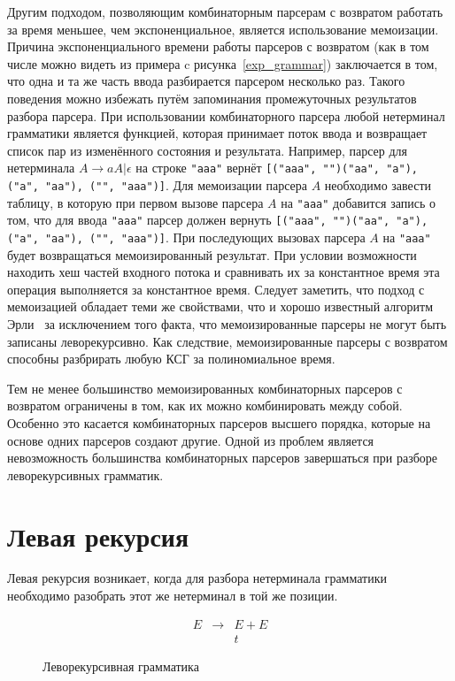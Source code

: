 \documentclass[times]{itmo-student-thesis}
\begin{document}
Другим подходом, позволяющим комбинаторным парсерам с возвратом работать за время меньшее, чем экспоненциальное,
является использование мемоизации. Причина экспоненциального времени работы парсеров с возвратом (как в том числе
можно видеть из примера c рисунка~\ref{exp_grammar}) заключается в том, что одна и та же часть ввода разбирается
парсером несколько раз. Такого поведения можно избежать путём запоминания промежуточных результатов разбора парсера.
При использовании комбинаторного парсера любой нетерминал грамматики является функцией, которая принимает поток ввода и
возвращает список пар из изменённого состояния и результата. Например, парсер для нетерминала $A \to aA | \epsilon$ на
строке \lstinline{"aaa"} вернёт \lstinline{[("aaa", "")("aa", "a"), ("a", "aa"), ("", "aaa")]}. Для мемоизации парсера
$A$ необходимо завести таблицу, в которую при первом вызове парсера $A$ на
\lstinline{"aaa"} добавится запись о том, что для ввода \lstinline{"aaa"} парсер должен вернуть
\lstinline{[("aaa", "")("aa", "a"), ("a", "aa"), ("", "aaa")]}. При последующих вызовах парсера $A$ на \lstinline{"aaa"}
будет возвращаться мемоизированный результат. При условии возможности находить хеш частей входного потока и сравнивать
их за константное время эта операция выполняется за константное время. Следует заметить, что подход с мемоизацией
обладает теми же свойствами, что и хорошо известный алгоритм Эрли~\cite{earley_efficient_1970, norvig_techniques_1991} 
за исключением того факта, что мемоизированные парсеры не могут быть записаны леворекурсивно. Как следствие,
мемоизированные парсеры с возвратом способны разбрирать любую КСГ за полиномиальное время.

Тем не менее большинство мемоизированных комбинаторных парсеров с возвратом ограничены в том, как их можно
комбинировать между собой. Особенно это касается комбинаторных парсеров высшего порядка, которые на основе одних
парсеров создают другие. Одной из проблем является невозможность большинства комбинаторных парсеров завершаться при
разборе леворекурсивных грамматик.

\section{Левая рекурсия}\label{sec:left_recursion}

Левая рекурсия возникает, когда для разбора нетерминала грамматики необходимо разобрать этот же нетерминал в той же позиции. 

\begin{figure}[!h]
    \caption{Леворекурсивная грамматика}\label{leftrec_grammar}
    \[
        \begin{array}{lll}
            E & \to & E+E \\
              &     & t
        \end{array}
    \]
\end{figure}
\end{document}
